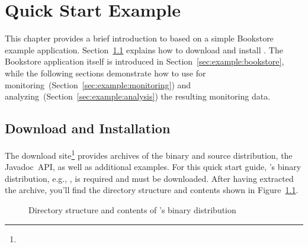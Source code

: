 % 


\chapter{Quick Start Example}\label{chap:example}

This chapter provides a brief introduction to \Kieker{} based on a simple Bookstore example application. Section~\ref{sec:example:downloadInstall} explains how to download and install \Kieker{}. The Bookstore application itself is introduced in Section~\ref{sec:example:bookstore}, while the following sections demonstrate how to use \Kieker{} for monitoring~(Section~\ref{sec:example:monitoring}) and analyzing~(Section~\ref{sec:example:analysis}) the resulting monitoring data. 

\section{Download and Installation}\label{sec:example:downloadInstall}

The \Kieker{} download site\footnote{\KiekerDownloadURL{}} provides archives of the binary and source distribution, the Javadoc~API, as well as additional examples. For this quick start guide, \Kieker{}'s binary distribution, e.g., \file{\binaryFileForDownload}, is required and must be downloaded. After having extracted the archive, you'll find the directory structure and contents shown in Figure~\ref{fig:binary-layout}.

\enlargethispage{0.8cm}

\begin{figure}[h!]%
\begin{graybox}
\end{graybox}
\caption{Directory structure and contents of \Kieker{}'s binary distribution}
\label{fig:binary-layout}
\end{figure}

